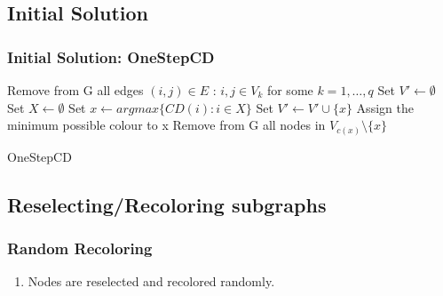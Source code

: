 \documentclass{beamer}
\begin{document}
\subsection{Initial Solution}
\begin{frame}
\frametitle{Initial Solution: OneStepCD}
  \begin{algorithm}[H]
  \scriptsize
  Remove from G all edges $(i,j) \in E$ : $i,j \in V_k$ for some $k=1,\ldots,q$\; 
  Set $V' \gets \emptyset $\;
   {
    Set $X \gets \emptyset $\;
    Set $x \gets argmax\{CD(i) : i \in X \}$\;
    Set $V' \gets V' \cup \{x\}$\;
    Assign the minimum possible colour to x\;
    Remove from G all nodes in $V_{c(x)} \setminus \{x\} $\;
  }
  \;
  \caption{{\sc OneStepCD}}
  \label{algo:osdc}
  \end{algorithm}
\end{frame}

\FloatBarrier
\subsection{Reselecting/Recoloring subgraphs}
\begin{frame}
\frametitle{Random Recoloring}
\begin{enumerate}
\item Nodes are reselected and recolored randomly.
\end{enumerate}

\end{frame}
\end{document}
